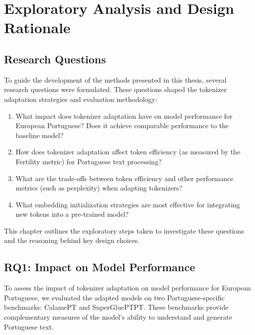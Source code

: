 
\chapter{Exploratory Analysis and Design Rationale}


\label{chap:exploration}

\section{Research Questions}
\label{sec:research_questions}

To guide the development of the methods presented in this thesis, several research questions were formulated. These questions shaped the tokenizer adaptation strategies and evaluation methodology:

\begin{enumerate}
    \item What impact does tokenizer adaptation have on model performance for European Portuguese? Does it achieve comparable performance to the baseline model?
    
    \item How does tokenizer adaptation affect token efficiency (as measured by the Fertility metric) for Portuguese text processing?
    
    \item What are the trade-offs between token efficiency and other performance metrics (such as perplexity) when adapting tokenizers?
    
    \item What embedding initialization strategies are most effective for integrating new tokens into a pre-trained model?
\end{enumerate}

This chapter outlines the exploratory steps taken to investigate these questions and the reasoning behind key design choices.

\section{RQ1: Impact on Model Performance}
\label{sec:model_performance}

To assess the impact of tokenizer adaptation on model performance for European Portuguese, we evaluated the adapted models on two Portuguese-specific benchmarks: CalamePT and SuperGluePTPT. These benchmarks provide complementary measures of the model's ability to understand and generate Portuguese text.

